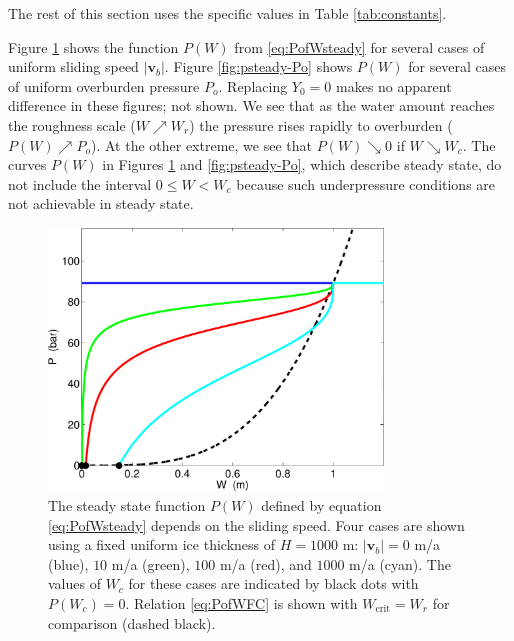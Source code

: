 \documentclass[11pt,final]{amsart}%
\newcommand\bv{\mathbf{v}}
\begin{document}
The rest of this section uses the specific values in Table \ref{tab:constants}.

\newcommand{\upto}{ \!\!\nearrow\! }
\newcommand{\downto}{ \!\searrow\! }
Figure \ref{fig:psteady-vb} shows the function $P(W)$ from \eqref{eq:PofWsteady} for several cases of uniform sliding speed $|\bv_b|$.  Figure \ref{fig:psteady-Po} shows $P(W)$ for several cases of uniform overburden pressure $P_o$.  Replacing $Y_0=0$ makes no apparent difference in these figures; not shown.  We see that as the water amount reaches the roughness scale ($W\upto W_r$) the pressure rises rapidly to overburden ($P(W) \upto P_o$).  At the other extreme, we see that $P(W) \downto 0$ if $W \downto W_c$.  The curves $P(W)$ in Figures \ref{fig:psteady-vb} and \ref{fig:psteady-Po}, which describe steady state, do not include the interval $0\le W < W_c$ because such underpressure conditions are not achievable in steady state.

\begin{figure}[ht]
\includegraphics[width=3.5in,keepaspectratio=true]{figs/psteady-vb}
\medskip
\caption{The steady state function $P(W)$ defined by equation \eqref{eq:PofWsteady} depends on the sliding speed.  Four cases are shown using a fixed uniform ice thickness of $H=1000$ m: $|\bv_b|=0$ m/a (blue), $10$ m/a (green), $100$ m/a (red), and $1000$ m/a (cyan).  The values of $W_c$ for these cases are indicated by black dots with $P(W_c)=0$.  Relation \eqref{eq:PofWFC} is shown with $W_{\text{crit}}=W_r$ for comparison (dashed black).}
\label{fig:psteady-vb}
\end{figure}
\end{document}
